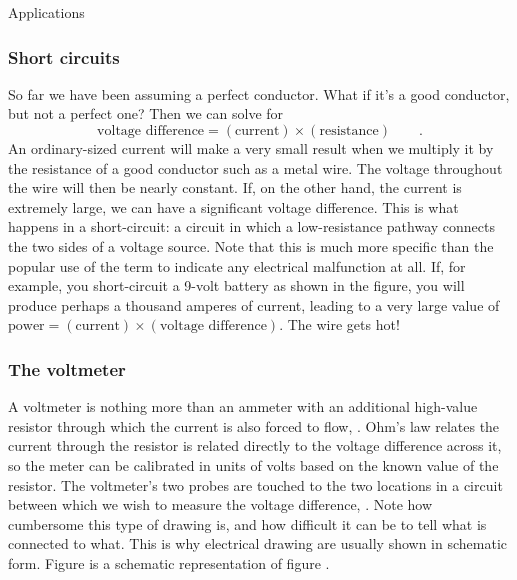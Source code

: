 \begin{envsubsection}{Applications}
\subsubsection{Short circuits}
So far we have been assuming a perfect conductor. What if it's
a good conductor, but not a perfect one? Then we can
solve for
\begin{equation*}
	\text{voltage difference} = (\text{current})\times(\text{resistance}) \qquad .
\end{equation*}
An ordinary-sized current
will make a very small result when we multiply it by the
resistance of a good conductor such as a metal wire. The
voltage throughout the wire will then be nearly constant.
If, on the other hand, the current is extremely large, we
can have a significant voltage difference. This is what
happens in a short-circuit:
a circuit in which a low-resistance pathway connects the two
sides of a voltage source. Note that this is much more
specific than the popular use of the term to indicate any
electrical malfunction at all. If, for example, you
short-circuit a 9-volt battery as shown in the figure, you
will produce perhaps a thousand amperes of current, leading
to a very large value of $\text{power}=(\text{current})\times(\text{voltage difference})$.
The wire gets hot!

\subsubsection{The voltmeter}
A voltmeter is nothing more than an ammeter with an
additional high-value resistor through which the current is
also forced to flow, . Ohm's law relates the current through
the resistor is related directly to the voltage difference
across it, so the meter can be calibrated in units of volts
based on the known value of the resistor. The voltmeter's
two probes are touched to the two locations in a circuit
between which we wish to measure the voltage difference,
. Note how cumbersome this type of drawing is, and how
difficult it can be to tell what is connected to what. This
is why electrical drawing are usually shown in schematic
form. Figure  is a schematic representation of figure 
.


\end{envsubsection}
